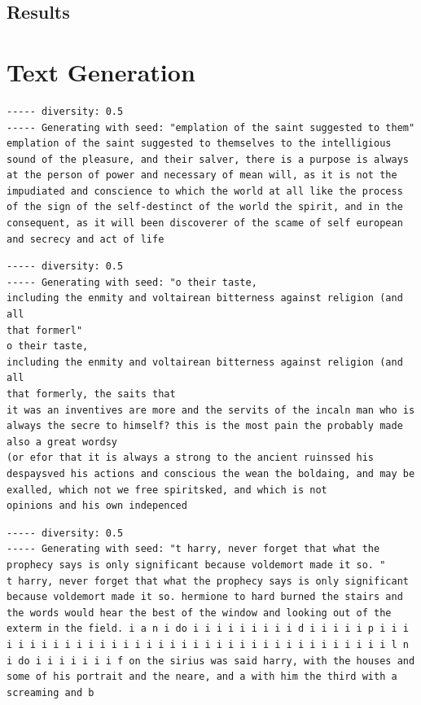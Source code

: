 \documentclass{article}[]
\begin{document}
\subsection{Results}
\label{sec:autoencoder-results}



\appendix
\section{Text Generation}
\begin{lstlisting}[label=nietzsche-low-diverse, caption={riginal script with Nietzsche after 60 epochs and a diversity of 0.5}]
----- diversity: 0.5
----- Generating with seed: "emplation of the saint suggested to them"
emplation of the saint suggested to themselves to the intelligious sound of the pleasure, and their salver, there is a purpose is always at the person of power and necessary of mean will, as it is not the impudiated and conscience to which the world at all like the process of the sign of the self-destinct of the world the spirit, and in the consequent, as it will been discoverer of the scame of self european and secrecy and act of life 
\end{lstlisting}

\begin{lstlisting}[label=nietzsche-adjusted-low-diverse, caption={adjusted original script with Nietzsche after 60 epochs and a diversity of 0.5}]
----- diversity: 0.5
----- Generating with seed: "o their taste,
including the enmity and voltairean bitterness against religion (and all
that formerl"
o their taste,
including the enmity and voltairean bitterness against religion (and all
that formerly, the saits that
it was an inventives are more and the servits of the incaln man who is always the secre to himself? this is the most pain the probably made also a great wordsy
(or efor that it is always a strong to the ancient ruinssed his despaysved his actions and conscious the wean the boldaing, and may be exalled, which not we free spiritsked, and which is not
opinions and his own indepenced
\end{lstlisting}


\begin{lstlisting}[label=harry-adjusted-low-diverse, caption={adjusted original script with Harry Potter after 7 epochs and a diversity of 0.5}]
----- diversity: 0.5
----- Generating with seed: "t harry, never forget that what the prophecy says is only significant because voldemort made it so. "
t harry, never forget that what the prophecy says is only significant because voldemort made it so. hermione to hard burned the stairs and the words would hear the best of the window and looking out of the exterm in the field. i a n i do i i i i i i i i i d i i i i i p i i i i i i i i i i i i i i i i i i i i i i i i i i i i i i i i i i i i l n i do i i i i i i i f on the sirius was said harry, with the houses and some of his portrait and the neare, and a with him the third with a screaming and b
\end{lstlisting}
\end{document}

